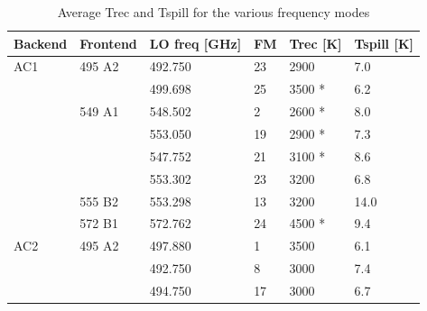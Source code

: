 \begin{table}
\caption{ Average Trec and Tspill for the various frequency modes }
\label{table:config5}
\begin{tabular}{|l|l|l|l|l|l|}
  \hline
  \textbf{Backend} & \textbf{Frontend} & \textbf{LO freq {[}GHz{]}} & \textbf{FM} & \textbf{Trec {[}K{]}} & \textbf{Tspill {[}K{]}} \\
  \hline
  AC1              & 495 A2            & 492.750                    & 23          & 2900                  & 7.0 \\
  \cline{3-3}
  \cline{4-4}
  \cline{5-5}
  \cline{6-6}
                   &                    & 499.698                   & 25          & 3500 *                & 6.2 \\
  \cline{2-2}
  \cline{3-3}
  \cline{4-4}
  \cline{5-5}
  \cline{6-6}
                   & 549 A1             & 548.502                  & 2            & 2600 *                & 8.0 \\
  \cline{3-3}
  \cline{4-4}
  \cline{5-5}
  \cline{6-6}     
                  &                     & 553.050                  & 19           & 2900 *                & 7.3 \\
  \cline{3-3}
  \cline{4-4}
  \cline{5-5}
  \cline{6-6}
                  &                     & 547.752                  & 21           & 3100 *                & 8.6 \\
  \cline{3-3}
  \cline{4-4}
  \cline{5-5}
  \cline{6-6}
                  &                     & 553.302                  & 23           & 3200                  & 6.8 \\
  \cline{2-2}
  \cline{3-3}
  \cline{4-4}
  \cline{5-5}
  \cline{6-6}
                 & 555 B2              & 553.298                   & 13           & 3200                  & 14.0 \\
  \cline{2-2}
  \cline{3-3}
  \cline{4-4}
  \cline{5-5}
  \cline{6-6}
                & 572 B1               & 572.762                   & 24           & 4500 *                & 9.4 \\
  \hline
  AC2           & 495 A2               & 497.880                   & 1            & 3500                  & 6.1 \\
  \cline{3-3}
  \cline{4-4}
  \cline{5-5}
  \cline{6-6}
                &                      & 492.750                   & 8            & 3000                  & 7.4 \\
  \cline{3-3}
  \cline{4-4}
  \cline{5-5}
  \cline{6-6}
                &                      & 494.750                   & 17           & 3000                  & 6.7 \\

\end{tabular}
\end{table}
